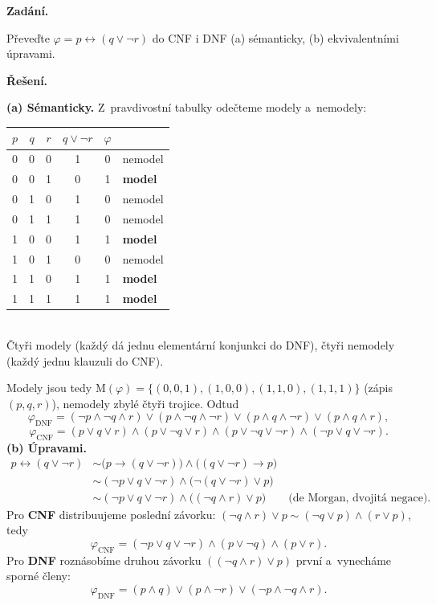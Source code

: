 \documentclass[11pt,a4paper]{article}
\newcommand{\Mset}{\mathrm{M}}              %
\begin{document}
\begin{priklad}
\textbf{Zadání.}\par
Převeďte $\varphi=p\leftrightarrow(q\vee\neg r)$ do CNF i DNF (a) sémanticky, (b) ekvivalentními úpravami.

\smallskip
\textbf{Řešení.}\par
\textbf{(a) Sémanticky.} Z~pravdivostní tabulky odečteme modely a~nemodely:
\begin{center}\small
\begin{tabular}{ccc|c|c|l}
\toprule
$p$&$q$&$r$&$q\vee\neg r$&$\varphi$&\\
\midrule
0&0&0&1&0&nemodel\\
0&0&1&0&1&\textbf{model}\\
0&1&0&1&0&nemodel\\
0&1&1&1&0&nemodel\\
1&0&0&1&1&\textbf{model}\\
1&0&1&0&0&nemodel\\
1&1&0&1&1&\textbf{model}\\
1&1&1&1&1&\textbf{model}\\
\bottomrule
\end{tabular}\\[0.4mm]
{\footnotesize Čtyři modely (každý dá jednu elementární konjunkci do DNF), čtyři nemodely (každý jednu klauzuli do CNF).}
\end{center}
Modely jsou tedy $\Mset(\varphi)=\{(0,0,1),(1,0,0),(1,1,0),(1,1,1)\}$ (zápis $(p,q,r)$), nemodely zbylé čtyři trojice. Odtud
\[
\varphi_{\mathrm{DNF}}=(\neg p\wedge\neg q\wedge r)\vee(p\wedge\neg q\wedge\neg r)\vee(p\wedge q\wedge\neg r)\vee(p\wedge q\wedge r),
\]
\[
\varphi_{\mathrm{CNF}}=(p\vee q\vee r)\wedge(p\vee\neg q\vee r)\wedge(p\vee\neg q\vee\neg r)\wedge(\neg p\vee q\vee\neg r).
\]
\textbf{(b) Úpravami.}
\begin{align*}
p\leftrightarrow(q\vee\neg r)
&\sim\big(p\to(q\vee\neg r)\big)\wedge\big((q\vee\neg r)\to p\big)\\
&\sim(\neg p\vee q\vee\neg r)\wedge\big(\neg(q\vee\neg r)\vee p\big)\\
&\sim(\neg p\vee q\vee\neg r)\wedge\big((\neg q\wedge r)\vee p\big)
\qquad\text{(de Morgan, dvojitá negace).}
\end{align*}
Pro \textbf{CNF} distribuujeme poslední závorku: $(\neg q\wedge r)\vee p\sim(\neg q\vee p)\wedge(r\vee p)$, tedy
\[
\boxed{\varphi_{\mathrm{CNF}}=(\neg p\vee q\vee\neg r)\wedge(p\vee\neg q)\wedge(p\vee r).}
\]
Pro \textbf{DNF} roznásobíme druhou závorku $((\neg q\wedge r)\vee p)$ první a~vynecháme sporné členy:
\[
\boxed{\varphi_{\mathrm{DNF}}=(p\wedge q)\vee(p\wedge\neg r)\vee(\neg p\wedge\neg q\wedge r).}
\]
\end{priklad}
\end{document}
